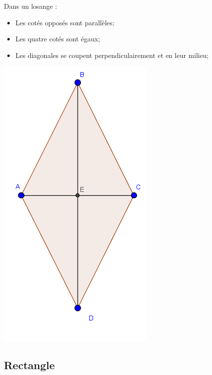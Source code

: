 \documentclass[12pt,a4paper]{article}
\begin{document}
\begin{myprops}
	
	\begin{multicols}{2}
		
		Dans un losange :
		\begin{itemize}
			\item Les cotés opposés sont parallèles;
			\item Les quatre cotés sont égaux;
			\item Les diagonales se coupent perpendiculairement et en leur milieu;			
		\end{itemize}
		
			
		\includegraphics[scale=0.5]{./img/losa}
	\end{multicols}
			
	\end{myprops}


\subsection{Rectangle}
\end{document}
